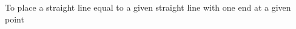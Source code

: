 \documentclass[preview]{standalone}
\begin{document}
\begin{center}
To place a straight line equal to a given straight line with one end at a given point
\end{center}
\end{document}
